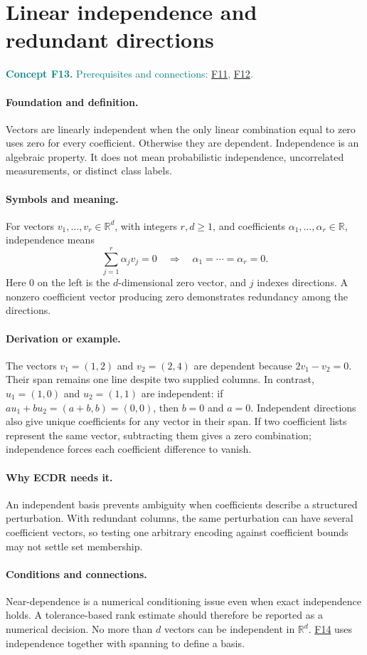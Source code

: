 \documentclass[11pt,a4paper]{article}
\newcommand{\R}{\mathbb R}
\newcommand{\conceptid}{Front matter}
\newcommand{\concept}[3]{\clearpage\renewcommand{\conceptid}{#1}%
\section{#2}\label{concept:#1}%
\textcolor{teal}{\textbf{Concept #1.} Prerequisites and connections: #3.}\par
\typeout{ECDR-CONCEPT-START #1 PAGE=\thepage}}
\begin{document}
\concept{F13}{Linear independence and redundant directions}{\hyperref[concept:F11]{F11}, \hyperref[concept:F12]{F12}}
\paragraph{Foundation and definition.}
Vectors are linearly independent when the only linear combination equal
to zero uses zero for every coefficient. Otherwise they are dependent.
Independence is an algebraic property. It does not mean probabilistic
independence, uncorrelated measurements, or distinct class labels.
\paragraph{Symbols and meaning.}
For vectors $v_1,\ldots,v_r\in\R^d$, with integers $r,d\ge1$, and
coefficients $\alpha_1,\ldots,\alpha_r\in\R$, independence means
\[
 \sum_{j=1}^{r}\alpha_jv_j=0
 \quad\Rightarrow\quad
 \alpha_1=\cdots=\alpha_r=0.
\]
Here $0$ on the left is the $d$-dimensional zero vector, and $j$ indexes
directions. A nonzero coefficient vector producing zero demonstrates
redundancy among the directions.
\paragraph{Derivation or example.}
The vectors $v_1=(1,2)$ and $v_2=(2,4)$ are dependent because
$2v_1-v_2=0$. Their span remains one line despite two supplied columns.
In contrast, $u_1=(1,0)$ and $u_2=(1,1)$ are independent: if
$a u_1+b u_2=(a+b,b)=(0,0)$, then $b=0$ and $a=0$.
Independent directions also give unique coefficients for any vector in
their span. If two coefficient lists represent the same vector,
subtracting them gives a zero combination; independence forces each
coefficient difference to vanish.
\paragraph{Why ECDR needs it.}
An independent basis prevents ambiguity when coefficients describe a
structured perturbation. With redundant columns, the same perturbation
can have several coefficient vectors, so testing one arbitrary encoding
against coefficient bounds may not settle set membership.
\paragraph{Conditions and connections.}
Near-dependence is a numerical conditioning issue even when exact
independence holds. A tolerance-based rank estimate should therefore be
reported as a numerical decision. No more than $d$ vectors can be
independent in $\R^d$. \hyperref[concept:F14]{F14} uses independence together with spanning to
define a basis.
\par\label{endconcept:F13}
\end{document}
